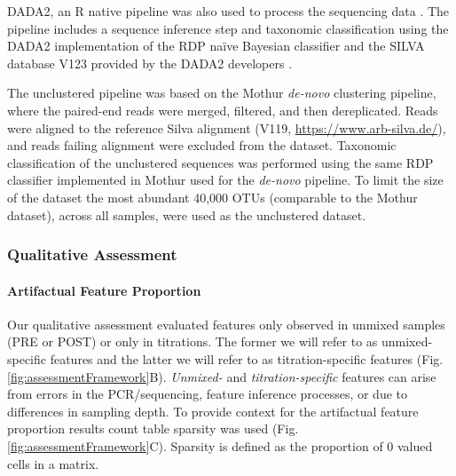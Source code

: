 \documentclass[linenumbers]{bmcart}
\begin{document}
DADA2, an R native pipeline was also used to process the sequencing data
\cite{callahan2016dada2}. The pipeline includes a sequence inference
step and taxonomic classification using the DADA2 implementation of the
RDP naïve Bayesian classifier \cite{wang2007naive} and the SILVA
database V123 provided by the DADA2 developers
\cite[\url{https://benjjneb.github.io/dada2/training.html}]{quast2012silva}.

The unclustered pipeline was based on the Mothur \emph{de-novo}
clustering pipeline, where the paired-end reads were merged, filtered,
and then dereplicated. Reads were aligned to the reference Silva
alignment (V119, \url{https://www.arb-silva.de/}), and reads failing
alignment were excluded from the dataset. Taxonomic classification of
the unclustered sequences was performed using the same RDP classifier
implemented in Mothur used for the \emph{de-novo} pipeline. To limit the
size of the dataset the most abundant 40,000 OTUs (comparable to the
Mothur dataset), across all samples, were used as the unclustered
dataset.


\subsubsection*{Qualitative Assessment}
\paragraph*{Artifactual Feature Proportion}
Our qualitative assessment evaluated features only observed in unmixed samples (PRE or POST) or only in titrations.
The former we will refer to as unmixed-specific features and the latter we will refer to as titration-specific features (Fig. \ref{fig:assessmentFramework}B).
\emph{Unmixed-} and \emph{titration-specific} features can arise from errors in the PCR/sequencing, feature inference processes, or due to differences in sampling depth. 
To provide context for the artifactual feature proportion results count table sparsity was used (Fig. \ref{fig:assessmentFramework}C).
Sparsity is defined as the proportion of 0 valued cells in a matrix.
\end{document}
